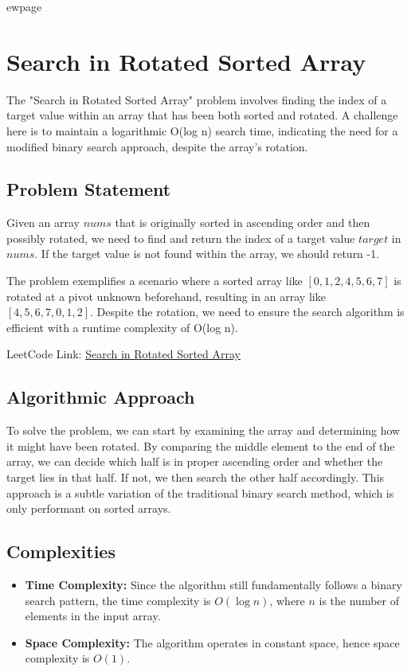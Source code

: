 
ewpage

\chapter{Search in Rotated Sorted Array}
\label{chap:Search_in_Rotated_Sorted_Array}
The "Search in Rotated Sorted Array" problem involves finding the index of a target value within an array that has been both sorted and rotated. A challenge here is to maintain a logarithmic O(log n) search time, indicating the need for a modified binary search approach, despite the array's rotation.

\section*{Problem Statement}

Given an array \( nums \) that is originally sorted in ascending order and then possibly rotated, we need to find and return the index of a target value \( target \) in \( nums \). If the target value is not found within the array, we should return -1.

The problem exemplifies a scenario where a sorted array like \([0,1,2,4,5,6,7]\) is rotated at a pivot unknown beforehand, resulting in an array like \([4,5,6,7,0,1,2]\). Despite the rotation, we need to ensure the search algorithm is efficient with a runtime complexity of O(log n).

LeetCode Link: \href{https://leetcode.com/problems/search-in-rotated-sorted-array/}{Search in Rotated Sorted Array}

\section*{Algorithmic Approach}

To solve the problem, we can start by examining the array and determining how it might have been rotated. By comparing the middle element to the end of the array, we can decide which half is in proper ascending order and whether the target lies in that half. If not, we then search the other half accordingly. This approach is a subtle variation of the traditional binary search method, which is only performant on sorted arrays.

\section*{Complexities}
\begin{itemize}
	\item \textbf{Time Complexity:} Since the algorithm still fundamentally follows a binary search pattern, the time complexity is \( O(\log n) \), where \( n \) is the number of elements in the input array.
	\item \textbf{Space Complexity:} The algorithm operates in constant space, hence space complexity is \( O(1) \).
\end{itemize}


